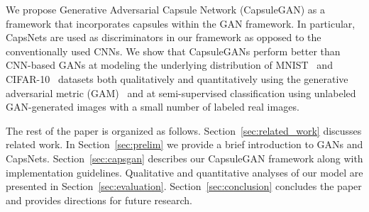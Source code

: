 We propose Generative Adversarial Capsule Network (CapsuleGAN) as a framework that incorporates capsules within the GAN framework. In particular, CapsNets are used as discriminators in our framework as opposed to the conventionally used CNNs. We show that CapsuleGANs perform better than CNN-based GANs at modeling the underlying distribution of MNIST~\cite{bib:mnist} and CIFAR-10~\cite{bib:cifar} datasets both qualitatively and quantitatively using the generative adversarial metric (GAM)~\cite{bib:gam} and at semi-supervised classification using unlabeled GAN-generated images with a small number of labeled real images.

The rest of the paper is organized as follows. Section~\ref{sec:related_work} discusses related work. In Section~\ref{sec:prelim} we provide a brief introduction to GANs and CapsNets. Section~\ref{sec:capsgan} describes our CapsuleGAN framework along with implementation guidelines. Qualitative and quantitative analyses of our model are presented in Section~\ref{sec:evaluation}. Section~\ref{sec:conclusion} concludes the paper and provides directions for future research.